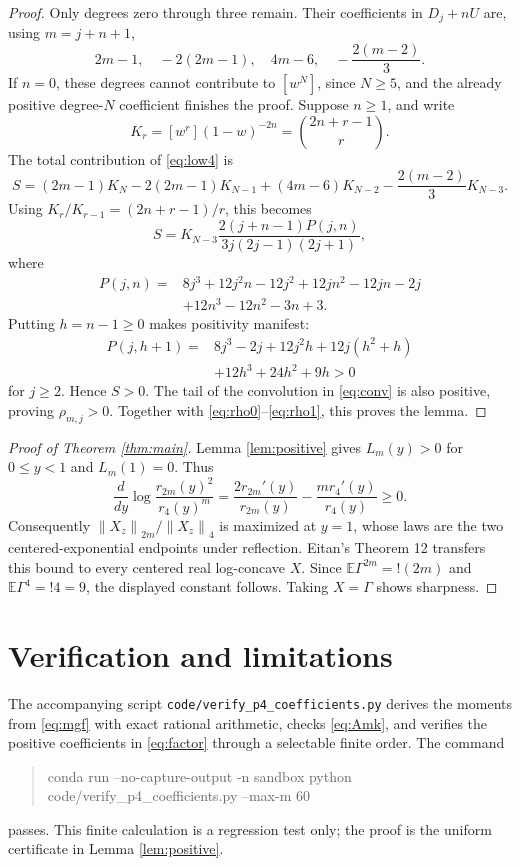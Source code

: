 \documentclass[11pt]{article}
\newcommand{\E}{\mathbb E}
\newcommand{\norm}[1]{\left\lVert #1\right\rVert}
\begin{document}
\begin{proof}
Only degrees zero through three remain.  Their coefficients in
\(D_j+nU\) are, using \(m=j+n+1\),
\begin{equation}\label{eq:low4}
 2m-1,\quad -2(2m-1),\quad 4m-6,\quad -\frac{2(m-2)}3.
\end{equation}
If \(n=0\), these degrees cannot contribute to \([w^N]\), since
\(N\geq5\), and the already positive degree-\(N\) coefficient finishes
the proof.  Suppose \(n\geq1\), and write
\[
 K_r=[w^r](1-w)^{-2n}=\binom{2n+r-1}{r}.
\]
The total contribution of \eqref{eq:low4} is
\[
 S=(2m-1)K_N-2(2m-1)K_{N-1}
 +(4m-6)K_{N-2}-\frac{2(m-2)}3K_{N-3}.
\]
Using \(K_r/K_{r-1}=(2n+r-1)/r\), this becomes
\begin{equation}\label{eq:S}
 S=K_{N-3}\frac{2(j+n-1)P(j,n)}
 {3j(2j-1)(2j+1)},
\end{equation}
where
\begin{align*}
 P(j,n)={}&8j^3+12j^2n-12j^2+12jn^2-12jn-2j\\
 &+12n^3-12n^2-3n+3.
\end{align*}
Putting \(h=n-1\geq0\) makes positivity manifest:
\begin{align*}
 P(j,h+1)={}&8j^3-2j+12j^2h+12j(h^2+h)\\
 &+12h^3+24h^2+9h>0
\end{align*}
for \(j\geq2\).  Hence \(S>0\).  The tail of the convolution in
\eqref{eq:conv} is also positive, proving \(\rho_{m,j}>0\).  Together with
\eqref{eq:rho0}--\eqref{eq:rho1}, this proves the lemma.
\end{proof}

\begin{proof}[Proof of Theorem \ref{thm:main}]
Lemma \ref{lem:positive} gives \(L_m(y)>0\) for \(0\leq y<1\) and
\(L_m(1)=0\).  Thus
\[
 \frac{d}{dy}\log\frac{r_{2m}(y)^2}{r_4(y)^m}
 =\frac{2r_{2m}'(y)}{r_{2m}(y)}
   -\frac{m r_4'(y)}{r_4(y)}\geq0.
\]
Consequently \(\norm{X_z}_{2m}/\norm{X_z}_4\) is maximized at
\(y=1\), whose laws are the two centered-exponential endpoints under
reflection.  Eitan's Theorem 12 transfers this bound to every centered real
log-concave \(X\).  Since \(\E\Gamma^{2m}=!(2m)\) and
\(\E\Gamma^4=!4=9\), the displayed constant follows.  Taking
\(X=\Gamma\) shows sharpness.
\end{proof}

\section{Verification and limitations}

The accompanying script \texttt{code/verify\_p4\_coefficients.py} derives
the moments from \eqref{eq:mgf} with exact rational arithmetic, checks
\eqref{eq:Amk}, and verifies the positive coefficients in
\eqref{eq:factor} through a selectable finite order.  The command
\begin{quote}\small\ttfamily
conda run --no-capture-output -n sandbox python\\
code/verify\_p4\_coefficients.py --max-m 60
\end{quote}
passes.  This finite calculation is a regression test only; the proof is the
uniform certificate in Lemma \ref{lem:positive}.
\end{document}
